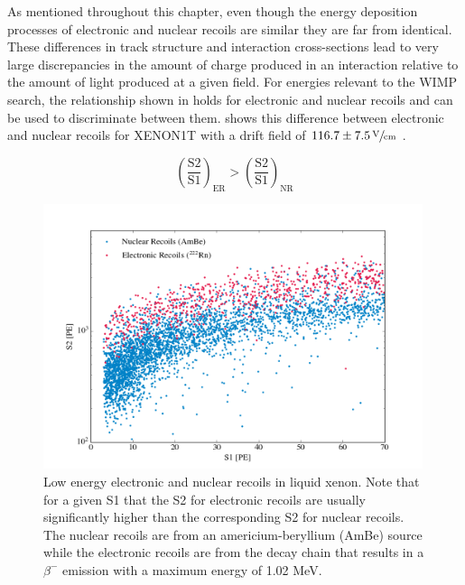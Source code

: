 As mentioned throughout this chapter, even though the energy deposition processes of electronic and nuclear recoils are similar they are far from identical.  These differences in track structure and interaction cross-sections lead to very large discrepancies in the amount of charge produced in an interaction relative to the amount of light produced at a given field.   For energies relevant to the WIMP search, the relationship shown in  holds for electronic and nuclear recoils and can be used to discriminate between them.   shows this difference between electronic and nuclear recoils for XENON1T with a drift field of $116.7 \pm 7.5  \,\sfrac{\textrm{V}}{\textrm{cm}}$ \cite{aprile2017first}.

\begin{equation}
        \label{eqn:lxe_disc}
        \left( \frac{\textrm{S2}}{\textrm{S1}} \right)_{\textrm{ER}} > \left( \frac{\textrm{S2}}{\textrm{S1}} \right)_{\textrm{NR}}
\end{equation}

\begin{figure}[t]
	\centering
	\includegraphics[width=0.99\textwidth]{xe1t_disc}
	\caption{Low energy electronic and nuclear recoils in liquid xenon.  Note that for a given S1 that the S2 for electronic recoils are usually significantly higher than the corresponding S2 for nuclear recoils.  The nuclear recoils are from an americium-beryllium (AmBe) source while the electronic recoils are from the  decay chain that results in a $\beta^-$ emission with a maximum energy of 1.02 MeV.}
	\label{fig:xe1t_disc}
\end{figure}

